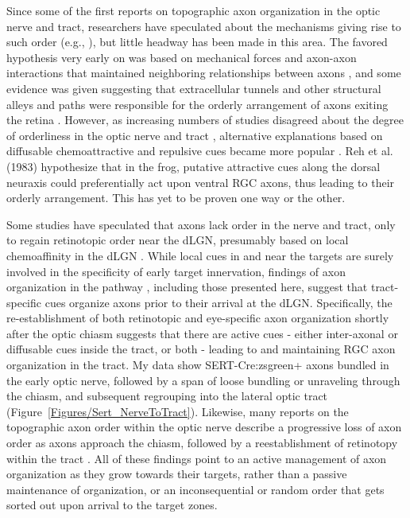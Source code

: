 Since some of the first reports on topographic axon organization in the optic nerve and tract, researchers have speculated about the mechanisms giving rise to such order (e.g., \cite{cook1977multiple,reh1983organization}), but little headway has been made in this area.
The favored hypothesis very early on was based on mechanical forces and axon-axon interactions that maintained neighboring relationships between axons \cite{cook1977multiple}, and some evidence was given suggesting that extracellular tunnels and other structural alleys and paths were responsible for the orderly arrangement of axons exiting the retina \cite{silver1980mechanism}.
However, as increasing numbers of studies disagreed about the degree of orderliness in the optic nerve and tract \cite{martin1983role}, alternative explanations based on diffusable chemoattractive and repulsive cues became more popular \cite{reh1983organization}.
Reh et al. (1983) hypothesize that in the frog, putative attractive cues along the dorsal neuraxis could preferentially act upon ventral RGC axons, thus leading to their orderly arrangement.
This has yet to be proven one way or the other.

Some studies have speculated that axons lack order in the nerve and tract, only to regain retinotopic order near the dLGN, presumably based on local chemoaffinity in the dLGN \cite{horton1979non}.
While local cues in and near the targets are surely involved in the specificity of early target innervation, findings of axon organization in the pathway \cite{martin1983role,chan1999changes,chan1994changes,plas2005pretarget,reese1993reestablishment}, including those presented here, suggest that tract-specific cues organize axons prior to their arrival at the dLGN.
Specifically, the re-establishment of both retinotopic and eye-specific axon organization shortly after the optic chiasm suggests that there are active cues - either inter-axonal or diffusable cues inside the tract, or both - leading to and maintaining RGC axon organization in the tract.
My data show SERT-Cre:zsgreen+ axons bundled in the early optic nerve, followed by a span of loose bundling or unraveling through the chiasm, and subsequent regrouping into the lateral optic tract (Figure~\ref{Figures/Sert_NerveToTract}).
Likewise, many reports on the topographic axon order within the optic nerve describe a progressive loss of axon order as axons approach the chiasm, followed by a reestablishment of retinotopy within the tract \cite{chan1999changes,plas2005pretarget,chan1994changes,simon1991relationship,reese1993reestablishment,horton1979non,naito1986course,naito1994retinogeniculate,colello1998changing,montgomery1998organization,ehrlich1984course}. 
All of these findings point to an active management of axon organization as they grow towards their targets, rather than a passive maintenance of organization, or an inconsequential or random order that gets sorted out upon arrival to the target zones.

